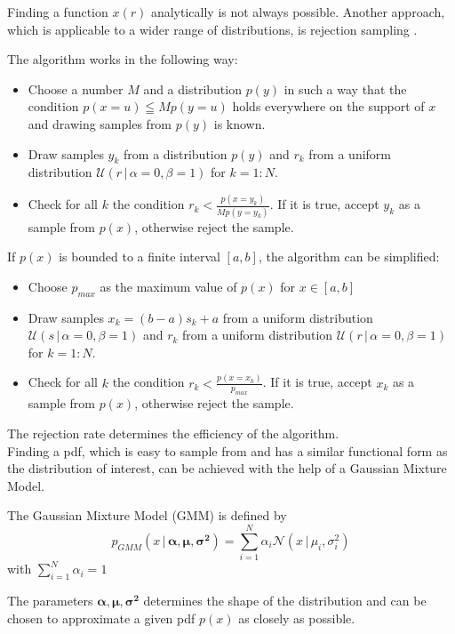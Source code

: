\documentclass{tstextbook}
\begin{document}
Finding a function $x(r)$ analytically is not always possible. Another approach, which is applicable to a wider range of distributions, is rejection sampling \cite{neumann1951}. 
\begin{definition}
  \label{th:rejectionsampling}
The algorithm works in the following way:
\begin{itemize}
\item
Choose a number $M$ and a distribution $p(y)$ in such a way that the condition $p(x=u)\leqq M p(y=u)$ holds everywhere on the support of $x$ and drawing samples from $p(y)$ is known. 
\item 
Draw samples $y_k$ from a distribution $p(y)$ and $r_k$ from a uniform distribution $\mathcal{U}(r\,\vert\,\alpha=0,\beta=1)$ for $k=1:N$.
\item
Check for all $k$ the condition $r_k < \frac{p(x=y_k)}{M p(y=y_k)}$. If it is true, accept $y_k$ as a sample from $p(x)$, otherwise reject the sample.
\end{itemize}
\end{definition}
If $p(x)$ is bounded to a finite interval $[a,b]$, the algorithm can be simplified:
\begin{itemize}
\item
Choose $p_{max}$ as the maximum value of $p(x)$ for $x\in [a,b]$
\item 
Draw samples $x_k=(b-a)s_k+a$ from a uniform distribution $\mathcal{U}(s\,\vert\,\alpha=0,\beta=1)$ and $r_k$ from a uniform distribution $\mathcal{U}(r\,\vert\,\alpha=0,\beta=1)$ for $k=1:N$.
\item
Check for all $k$ the condition $r_k < \frac{p(x=x_k)}{p_{max}}$. If it is true, accept $x_k$ as a sample from $p(x)$, otherwise reject the sample.
\end{itemize}
The rejection rate determines the efficiency of the algorithm.\\ 

Finding a pdf, which is easy to sample from and has a similar functional form as the distribution of interest, can be achieved with the help of a Gaussian Mixture Model.

\begin{definition}
  \label{th:gaussianmixturemodel}
  The Gaussian Mixture Model (GMM) is defined by
  \begin{equation}
    p_{GMM}(x\,\vert\,\boldsymbol{\alpha},\boldsymbol{\mu},\boldsymbol{\sigma^2}) = \sum_{i=1}^N \alpha_i \mathcal{N}\left(x\,\vert\,\mu_i,\sigma_i^2\right)
  \end{equation}
  with $\sum_{i=1}^N \alpha_i=1$
\end{definition}
The parameters $\boldsymbol{\alpha},\boldsymbol{\mu},\boldsymbol{\sigma^2}$ determines the shape of the distribution and can be chosen to approximate a given pdf $p(x)$ as closely as possible.\\
\end{document}
